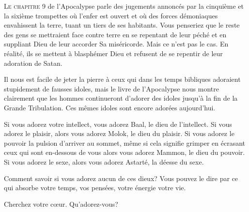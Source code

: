 

\lettrine{L}{e chapitre 9} de l'Apocalypse parle des jugements
 annoncés par la cinquième et la sixième trompettes où l'enfer est ouvert
 et où des forces démoniaques envahissent la terre,
 tuant un tiers de ses habitants.
 Vous penseriez que le reste des gens se mettraient face contre terre
 en se repentant de leur péché et en suppliant Dieu de leur accorder
 Sa miséricorde. Mais ce n'est pas le cas.
 En réalité, ils se mettent à blasphémer Dieu et refusent
 de se repentir de leur adoration de Satan.


Il nous est facile de jeter la pierre à ceux qui dans les temps bibliques
 adoraient stupidement de fausses idoles, mais le livre de l'Apocalypse
 nous montre clairement que les hommes continueront d'adorer des idoles
 jusqu'à la fin de la Grande Tribulation.
 Ces mêmes idoles sont encore adorées aujourd'hui.

Si vous adorez votre intellect, vous adorez Baal, le dieu de l'intellect.
 Si vous adorez le plaisir, alors vous adorez Molok, le dieu du plaisir.
 Si vous adorez le pouvoir \ocadr la pulsion d'arriver au sommet,
 même si cela signifie grimper en écrasant ceux qui sont en-dessous
 de vous \fcadr{} alors vous adorez Mammon, 
 le dieu du pouvoir. Si vous adorez le sexe, alors vous adorez Astarté,
 la déesse du sexe.

Comment savoir si vous adorez aucun 
 de ces dieux?
 Vous pouvez le dire par ce qui absorbe votre temps,
 vos pensées, votre énergie \ocadr votre vie.

Cherchez 
 votre c\oe{}ur. Qu'adorez-vous?

\dvrule




